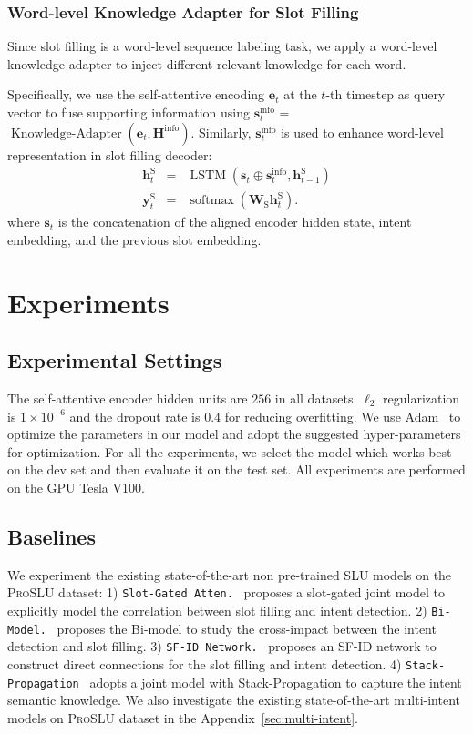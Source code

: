 \documentclass[letterpaper]{article} \usepackage{aaai22}  \usepackage{times}  \usepackage{helvet}  \usepackage{courier}  \usepackage[hyphens]{url}  \usepackage{graphicx} \urlstyle{rm} \def\UrlFont{\rm}  \usepackage{natbib}  \usepackage{caption} \DeclareCaptionStyle{ruled}{labelfont=normalfont,labelsep=colon,strut=off} \frenchspacing  \setlength{\pdfpagewidth}{8.5in}  \setlength{\pdfpageheight}{11in}  \usepackage{algorithm}
\begin{document}
\subsubsection{Word-level Knowledge Adapter for Slot Filling}
Since slot filling is a word-level sequence labeling task, we apply a word-level knowledge adapter to inject different relevant knowledge for each word.

Specifically, we use the self-attentive encoding $\mathbf{e}_{t}$ at the $t$-th timestep as query vector to fuse supporting information using $\mathbf{s}_t^\text{info}$ =  $\operatorname{Knowledge-Adapter} (\mathbf{e}_{t}, \mathbf{H}^{\text{info}})$.
Similarly, $\mathbf{s}_t^\text{info}$ is used to enhance word-level representation in slot filling decoder:
\begin{eqnarray}
    {\mathbf{h}}_{t}^{\mathrm{S}} &=& \operatorname{LSTM} \left(\mathbf{s}_t \oplus \mathbf{s}_t^\text{info},\mathbf{h}^{\mathrm{S}}_{t-1} \right)\\
	{\mathbf{y}}_{t}^{\mathrm{S}} &=& \operatorname{softmax} \left({\mathbf{W}}_{\mathrm{S}} {\mathbf{h}}_{t}^{\mathrm{S}}\right).
\end{eqnarray}
where $\mathbf{s}_t$ is the concatenation of the aligned encoder hidden state, intent embedding, and the previous slot embedding.  \section{Experiments}
\label{experiments}
\subsection{Experimental Settings}
The self-attentive encoder hidden units are $256$ in all datasets. $\ell_2$ regularization is $1 \times 10^{-6}$ and the dropout rate is $0.4$ for reducing overfitting. We use Adam~\citep{kingma2014adam} to optimize the parameters in our model and adopt the suggested hyper-parameters for optimization. For all the experiments, we select the model which works best on the dev set and then evaluate it on the test set. All experiments are performed on the GPU Tesla V100. 

\subsection{Baselines}
We experiment the existing state-of-the-art non pre-trained SLU models on the \textsc{ProSLU} dataset: 
1) {\texttt{Slot-Gated Atten.}}~\citet{goo-etal-2018-slot} proposes a slot-gated joint model to explicitly model the correlation between slot filling and intent detection. 
2) {\texttt{Bi-Model.}}~\citet{wang-etal-2018-bi} proposes the Bi-model to study the cross-impact between the intent detection and slot filling. 
3) {\texttt{SF-ID Network.}}~\citet{e-etal-2019-novel} proposes an SF-ID network to construct direct connections for the slot filling and intent detection. 
4) {\texttt{Stack-Propagation}}~\citet{qin-etal-2019-stack} adopts a joint model with Stack-Propagation to capture the intent semantic knowledge.
We also investigate the existing state-of-the-art multi-intent models on \textsc{ProSLU} dataset in the Appendix~\ref{sec:multi-intent}.
\end{document}
